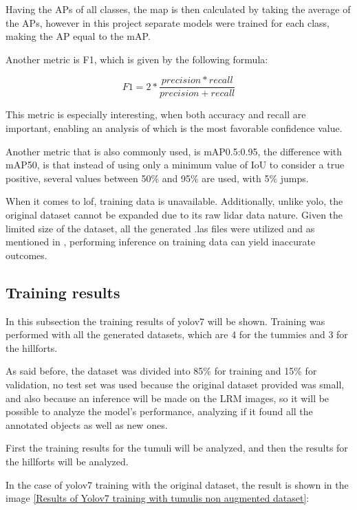 Having the APs of all classes, the \ac{map} is then calculated by taking the average of the APs, however in this project separate models were trained for each class, making the AP equal to the mAP.

Another metric is F1, which is given by the following formula:

\begin{equation}
     F1 = 2 * \frac{precision * recall}{precision + recall}
\end{equation}

This metric is especially interesting, when both accuracy and recall are important, enabling an analysis of which is the most favorable confidence value.

Another metric that is also commonly used, is mAP0.5:0.95, the difference with mAP50, is that instead of using only a minimum value of IoU to consider a true positive, several values between 50\% and 95\% are used, with 5\% jumps.

When it comes to lof, training data is unavailable. Additionally, unlike yolo, the original dataset cannot be expanded due to its raw lidar data nature. Given the limited size of the dataset, all the generated .las files were utilized and as mentioned in \cite{lof}, performing inference on training data can yield inaccurate outcomes.

\subsection{Training results}
In this subsection the training results of yolov7 will be shown. Training was performed with all the generated datasets, which are 4 for the tummies and 3 for the hillforts.

As said before, the dataset was divided into 85\% for training and 15\% for validation, no test set was used because the original dataset provided was small, and also because an inference will be made on the LRM images, so it will be possible to analyze the model's performance, analyzing if it found all the annotated objects as well as new ones.

First the training results for the tumuli will be analyzed, and then the results for the hillforts will be analyzed.

In the case of yolov7 training with the original dataset, the result is shown in the image \ref{Results of Yolov7 training with tumulis non augmented dataset}:

